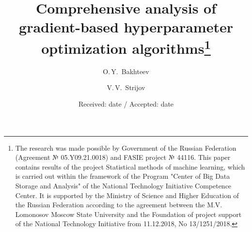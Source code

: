 \documentclass[smallcondensed]{svjour3}
\begin{document}




\title{Comprehensive analysis of gradient-based hyperparameter optimization algorithms\thanks{The research was made possible by Government of the Russian Federation (Agreement № 05.Y09.21.0018)  and FASIE project № 44116. This paper contains results of the project Statistical methods of machine learning, which is carried out within the framework of the Program "Center of Big Data Storage and Analysis" of the National Technology Initiative Competence Center. It is supported by the Ministry of Science and Higher Education of the Russian Federation according to the agreement between the M.V. Lomonosov Moscow State University and the Foundation of project support of the National Technology Initiative from 11.12.2018, No 13/1251/2018.}}%

\author{O.\,Y.~Bakhteev        \and
        V.\,V.~Strijov %
}


\date{Received: date / Accepted: date}


\maketitle
\end{document}
